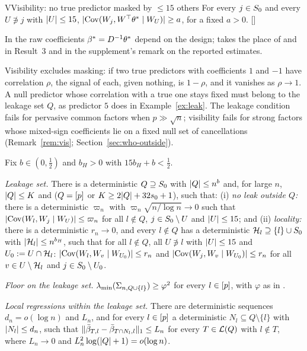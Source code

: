 \begin{assumption}{V}{Visibility: no true predictor masked by $\le15$ others}
For every $j\in S_0$ and every $U\not\ni j$ with $\lvert U\rvert\le15$, $\lvert \operatorname{Cov}(W_j,W^\top\theta^*\mid W_U)\rvert\ge a$, for a fixed
$a>0$. \hfill []
\end{assumption}

In  the raw coefficients $\beta^*=D^{-1}\theta^*$ depend on the design;  takes the place of  and 
in Result~3 and in the supplement's remark on the reported estimates.

Visibility excludes masking: if two true predictors with coefficients $1$ and $-1$ have correlation $\rho$, the
signal of each, given nothing, is $1-\rho$, and it vanishes as $\rho\to1$. A null predictor whose correlation with
a true one stays fixed must belong to the leakage set $Q$, as predictor $5$ does in Example~\ref{ex:leak}. The
leakage condition fails for pervasive common factors when $p\gg\sqrt n$; visibility fails for strong factors whose
mixed-sign coefficients lie on a fixed null set of cancellations (Remark~\ref{rem:vis}; Section~\ref{sec:who-outside}).

Fix $b\in(0,\tfrac12)$ and $b_H>0$ with $15b_H+b<\tfrac12$.

\begin{localassumption}\label{asm:reported}
\begin{asmitems}
  \item\label{asm:rr-leak} \emph{Leakage set.} There is a deterministic $Q\supseteq S_0$ with $\lvert Q\rvert\le n^b$ and, for
    large $n$, $\lvert Q\rvert\le K$ and ($Q=[p]$ or $K\ge2\lvert Q\rvert+32s_0+1$), such that: (i) \emph{no leak outside $Q$:}
    there is a deterministic $\varpi_n$ with $\varpi_n\sqrt{n/\log n}\to0$ such that
    $\lvert \operatorname{Cov}(W_l,W_j\mid W_U)\rvert\le\varpi_n$ for all $l\notin Q$, $j\in S_0\setminus U$ and $\lvert U\rvert\le15$; and (ii)
    \emph{locality:} there is a deterministic $r_n\to0$, and every $l\notin Q$ has a deterministic
    $\mathcal H_l\supseteq\{l\}\cup S_0$ with $\lvert \mathcal H_l\rvert\le n^{b_H}$, such that for all $l\notin Q$, all $U\not\ni l$ with
    $\lvert U\rvert\le15$ and $U_0:=U\cap\mathcal H_l$: $\lvert \operatorname{Cov}(W_l,W_v\mid W_{U_0})\rvert\le r_n$ and
    $\lvert \operatorname{Cov}(W_j,W_v\mid W_{U_0})\rvert\le r_n$ for all $v\in U\setminus\mathcal H_l$ and $j\in S_0\setminus U_0$.
  \item\label{asm:rr-floor} \emph{Floor on the leakage set.} $\lambda_{\min}(\Sigma_{n,Q\cup\{l\}})\ge\varphi^2$ for every
    $l\in[p]$, with $\varphi$ as in .
  \item\label{asm:rr-local} \emph{Local regressions within the leakage set.} There are deterministic sequences
    $d_n=o(\log n)$ and $L_n$, and for every $l\in[p]$ a deterministic $N_l\subseteq Q\setminus\{l\}$ with
    $\lvert N_l\rvert\le d_n$, such that $\lVert \bar\beta_{T,l}-\bar\beta_{T\cap N_l,l}\rVert_1\le L_n$ for every $T\in\mathcal L(Q)$ with
    $l\notin T$, where $L_n\to0$ and $L_n^2\log(\lvert Q\rvert+1)=o(\log n)$.
\end{asmitems}
\end{localassumption}

